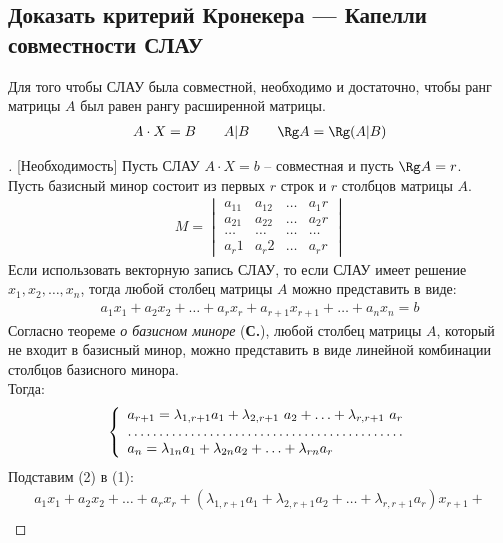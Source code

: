 \subsection{Доказать критерий Кронекера — Капелли совместности СЛАУ}
\begin{theorem*}
	Для того чтобы СЛАУ была совместной, необходимо и достаточно, чтобы ранг матрицы $A$ был равен рангу расширенной матрицы.
	\begin{gather*}
		A \cdot X = B \qquad A|B \qquad \Rg A = \Rg (A|B)
	\end{gather*}
\end{theorem*}
\begin{proof}[][Необходимость]
	Пусть СЛАУ $A\cdot X = b$ -- совместная и пусть $\Rg A = r$.\\
	Пусть базисный минор состоит из первых $r$ строк и $r$ столбцов матрицы $A$.
	\begin{gather*}
		M = \begin{vmatrix} 
			a_11 & a_12 & \ldots & a_1r \\
			a_21 & a_22 & \ldots & a_2r \\
			\ldots & \ldots & \ldots & \ldots\\
			a_r1 & a_r2 & \ldots & a_rr
		\end{vmatrix} 
	\end{gather*} 
	Если использовать векторную запись СЛАУ, то если СЛАУ имеет решение $x_1, x_2, \ldots, x_n$, тогда любой столбец матрицы $A$ можно представить в виде:
	\begin{gather}
		a_1x_1 + a_2x_2 + \ldots + a_rx_r + a_{r+1}x_{r+1} + \ldots + a_nx_n = b
	\end{gather}
	Согласно теореме \textit{о базисном миноре} (\textbf{С.\pageref{О базисном миноре}}), любой столбец матрицы $A$, который не входит в базисный минор, можно представить в виде линейной комбинации столбцов базисного минора.\\
	Тогда:
	\begin{align}
		\left\{ \begin{array}{l}
			a_{r+1} = \lambda_{1,r+1} a_1 + \lambda_{2,r+1}\ a_2 + \ldots + \lambda_{r, r+1}\ a_r \\
			\hdotsfor{1} \\
			a_n = \lambda_{1n}a_1 + \lambda_{2n}a_2 + \ldots + \lambda_{rn}a_r
		\end{array} \right.
	\end{align}
	Подставим (2) в (1):
	\begin{multline*}
		a_1x_1 + a_2x_2 + \ldots + a_rx_r + (\lambda_{1,r+1} a_1 + \lambda_{2,r+1} a_2 + \ldots + \lambda_{r, r+1}a_r)x_{r+1} + \\

\end{multline*}
\end{proof}
